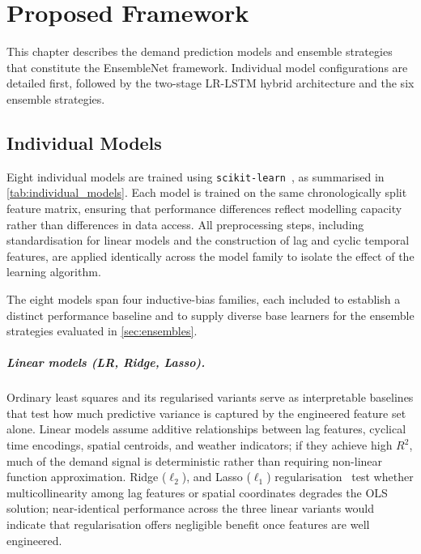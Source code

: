\chapter{Proposed Framework}
\label{ch:framework}
\label{ch:models}

This chapter describes the demand prediction models and ensemble strategies that constitute the EnsembleNet framework. Individual model configurations are detailed first, followed by the two-stage LR-LSTM hybrid architecture and the six ensemble strategies.

\section{Individual Models}

Eight individual models are trained using \texttt{scikit-learn}~\parencite{scikit-learn}, as summarised in \autoref{tab:individual_models}. Each model is trained on the same chronologically split feature matrix, ensuring that performance differences reflect modelling capacity rather than differences in data access. All preprocessing steps, including standardisation for linear models and the construction of lag and cyclic temporal features, are applied identically across the model family to isolate the effect of the learning algorithm.

The eight models span four inductive-bias families, each included to establish a distinct performance baseline and to supply diverse base learners for the ensemble strategies evaluated in \autoref{sec:ensembles}.

\paragraph{Linear models (LR, Ridge, Lasso).} Ordinary least squares and its regularised variants serve as interpretable baselines that test how much predictive variance is captured by the engineered feature set alone. Linear models assume additive relationships between lag features, cyclical time encodings, spatial centroids, and weather indicators; if they achieve high $R^2$, much of the demand signal is deterministic rather than requiring non-linear function approximation. Ridge ($\ell_2$), and Lasso ($\ell_1$) regularisation~\parencite{hoerl1970ridge,tibshirani1996lasso} test whether multicollinearity among lag features or spatial coordinates degrades the OLS solution; near-identical performance across the three linear variants would indicate that regularisation offers negligible benefit once features are well engineered.

